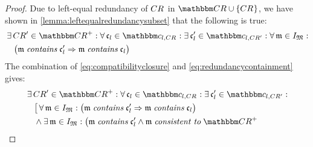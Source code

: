 \begin{proof}
    Due to left-equal redundancy of $\consistencyrelation{CR}{}$ in $\consistencyrelationset{CR} \cup \setted{\consistencyrelation{CR}{}}$, we have shown in \autoref{lemma:leftequalredundancysubset} that the following is true:
    \begin{align} \label{eq:redundancycontainment}
        & \nonumber 
        \exists \consistencyrelation{CR}{}' \in \transitiveclosure{\consistencyrelationset{CR}} : \forall \conditionelement{c}{l} \in \condition{c}{l, \consistencyrelation{CR}{}} : \exists \conditionelement{c}{l}' \in \condition{c}{l,\consistencyrelation{CR}{}'} : \forall \modeltuple{m} \in \metamodeltupleinstanceset{M} : \\
        & \formulaskip
        \big(
            \modeltuple{m} \containsmath \conditionelement{c}{l}' \Rightarrow \modeltuple{m} \containsmath \conditionelement{c}{l} 
        \big)
    \end{align}
    The combination of \autoref{eq:compatibilityclosure} and \autoref{eq:redundancycontainment} gives:
    \begin{align*}
        & \nonumber 
        \exists \consistencyrelation{CR}{}' \in \transitiveclosure{\consistencyrelationset{CR}} : \forall \conditionelement{c}{l} \in \condition{c}{l, \consistencyrelation{CR}{}} : \exists \conditionelement{c}{l}' \in \condition{c}{l,\consistencyrelation{CR}{}'} : \\
        & \formulaskip
        \big[
            \forall \modeltuple{m} \in \metamodeltupleinstanceset{M} : 
            \big(
                \modeltuple{m} \containsmath \conditionelement{c}{l}' \Rightarrow \modeltuple{m} \containsmath \conditionelement{c}{l} 
            \big) \\
            & \formulaskip
            \land \exists \modeltuple{m} \in \metamodeltupleinstanceset{M} :
            \big(
                \modeltuple{m} \containsmath \conditionelement{c}{l}' \land \modeltuple{m} \consistenttomath \transitiveclosure{\consistencyrelationset{CR}} 

\end{align*}
\end{proof}
